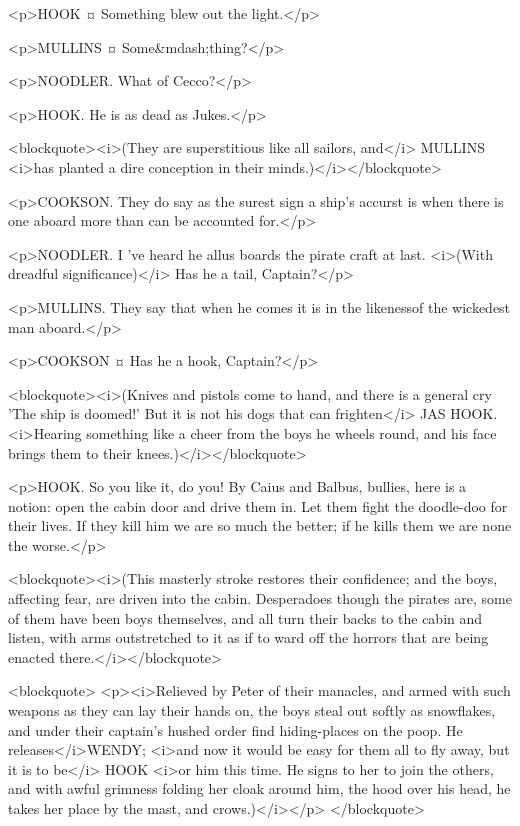 <p>HOOK ¤
Something blew out the light.</p>

<p>MULLINS ¤
Some&mdash;thing?</p>

<p>NOODLER. What of Cecco?</p>

<p>HOOK. He is as dead as Jukes.</p>

<blockquote><i>(They are superstitious like all sailors, and</i> MULLINS <i>has planted a dire conception in their minds.)</i></blockquote>

<p>COOKSON. They do say as the surest sign a ship's accurst is when there is one aboard more than can be accounted for.</p>

<p>NOODLER. I 've heard he allus boards the pirate craft at last. <i>(With dreadful significance)</i> Has he a tail, Captain?</p>

<p>MULLINS. They say that when he comes it is in the likenessof the wickedest man aboard.</p>

<p>COOKSON ¤
Has he a hook, Captain?</p>

<blockquote><i>(Knives and pistols come to hand, and there is a general cry 'The ship is doomed!' But it is not his dogs that can frighten</i> JAS HOOK. <i>Hearing something like a cheer from the boys he wheels round, and his face brings them to their knees.)</i></blockquote>

<p>HOOK. So you like it, do you! By Caius and Balbus, bullies, here is a notion: open the cabin door and drive them in. Let them fight the doodle-doo for their lives. If they kill him we are so much the better; if he kills them we are none the worse.</p>

<blockquote><i>(This masterly stroke restores their confidence; and the boys, affecting fear, are driven into the cabin. Desperadoes though the pirates are, some of them have been boys themselves, and all turn their backs to the cabin and listen, with arms outstretched to it as if to ward off the horrors that are being enacted there.</i></blockquote>

<blockquote> <p><i>Relieved by Peter of their manacles, and armed with such weapons as they can lay their hands on, the boys steal out softly as snowflakes, and under their captain's hushed order find hiding-places on the poop. He releases</i>WENDY; <i>and now it would be easy for them all to fly away, but it is to be</i> HOOK <i>or him this time. He signs to her to join the others, and with awful grimness folding her cloak around him, the hood over his head, he takes her place by the mast, and crows.)</i></p> </blockquote>

